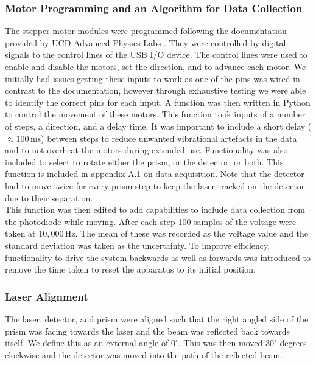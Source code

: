 \documentclass[%
reprint,
amsmath,amssymb,
aps,
]{revtex4-2}
\begin{document}
			\subsubsection{Motor Programming and an Algorithm for Data Collection}
				The stepper motor modules were programmed following the documentation provided by UCD Advanced Physics Labs \cite{motorDoc}. They were controlled by digital signals to the control lines of the USB I/O device. The control lines were used to enable and disable the motors, set the direction, and to advance each motor. We initially had issues getting these inputs to work as one of the pins was wired in contrast to the documentation, however through exhaustive testing we were able to identify the correct pins for each input. A function was then written in Python to control the movement of these motors. This function took inputs of a number of steps, a direction, and a delay time. It was important to include a short delay ($\approx 100\,\text{ms}$) between steps to reduce unwanted vibrational artefacts in the data and to not overheat the motors during extended use. Functionality was also included to select to rotate either the prism, or the detector, or both. This function is included in appendix A.1 on data acquisition. Note that the detector had to move twice for every prism step to keep the laser tracked on the detector due to their separation.\\
			
				This function was then edited to add capabilities to include data collection from the photodiode while moving. After each step 100 samples of the voltage were taken at $10,000\,\text{Hz}$. The mean of these was recorded as the voltage value and the standard deviation was taken as the uncertainty. To improve efficiency, functionality to drive the system backwards as well as forwards was introduced to remove the time taken to reset the apparatus to its initial position.\\

			\subsubsection{Laser Alignment}
				The laser, detector, and prism were aligned such that the right angled side of the prism was facing towards the laser and the beam was reflected back towards itself. We define this as an external angle of $0^\circ$. This was then moved $30^\circ$ degrees clockwise and the detector was moved into the path of the reflected beam.
			
\end{document}
